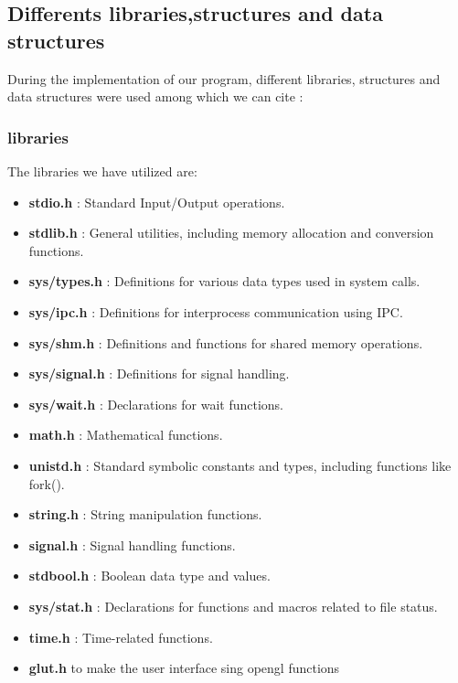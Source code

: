 \subsection{Differents libraries,structures and data structures}
    During the implementation of our program, different libraries, structures and data structures were used among which we can cite :

\subsubsection*{libraries}
The libraries we have utilized are:

\begin{itemize}
    \item \textbf{stdio.h} : Standard Input/Output operations.
    \item \textbf{stdlib.h} : General utilities, including memory allocation and conversion functions.
    \item \textbf{sys/types.h} : Definitions for various data types used in system calls.
    \item \textbf{sys/ipc.h} : Definitions for interprocess communication using IPC.
    \item \textbf{sys/shm.h} : Definitions and functions for shared memory operations.
    \item \textbf{sys/signal.h} : Definitions for signal handling.
    \item \textbf{sys/wait.h} : Declarations for wait functions.
    \item \textbf{math.h} : Mathematical functions.
    \item \textbf{unistd.h} : Standard symbolic constants and types, including functions like fork().
    \item \textbf{string.h} : String manipulation functions.
    \item \textbf{signal.h} : Signal handling functions.
    \item \textbf{stdbool.h} : Boolean data type and values.
    \item \textbf{sys/stat.h} : Declarations for functions and macros related to file status.
    \item \textbf{time.h} : Time-related functions.
    \item \textbf{glut.h} to make the user interface sing opengl functions 
\end{itemize}
\newpage
